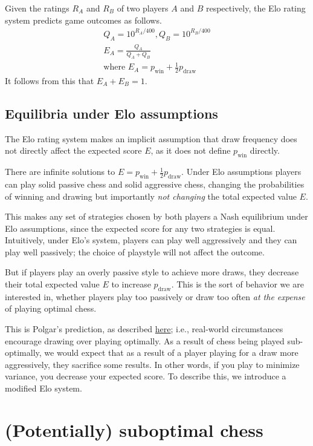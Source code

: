 \documentclass{article}
\begin{document}
Given the ratings $R_A$ and $R_B$ of two players $A$ and $B$ respectively, the Elo rating system predicts game outcomes as follows.
\begin{gather*}
    Q_A = 10^{R_A/400}, Q_B = 10^{R_B/400} \\
    E_A = \frac{Q_A}{Q_A+Q_B} \\
    \text{where } E_A = p_{\text{win}} + \frac{1}{2} p_{\text{draw}}
\end{gather*}
It follows from this that $E_A+E_B=1$.

\subsection{Equilibria under Elo assumptions}

The Elo rating system makes an implicit assumption that draw frequency does not directly affect
the expected score $E$, as it does not define $p_{\text{win}}$ directly.

There are infinite solutions to $E = p_{\text{win}} + \frac{1}{2} p_{\text{draw}}$.
Under Elo assumptions players can play solid passive chess and solid aggressive chess,
changing the probabilities of winning and drawing but importantly \textit{not changing}
the total expected value $E$.

This makes any set of strategies chosen by both players a Nash equilibrium under Elo assumptions, since the expected score for any two strategies is equal.
Intuitively, under Elo's system, players can play well
aggressively and they can play well passively; the choice of playstyle will not affect the outcome.

But if players play an overly passive style to achieve more draws,
they decrease their total expected value $E$ to increase $p_{\text{draw}}$.
This is the sort of behavior we are interested in, whether players play
too passively or draw too often \textit{at the expense} of playing optimal chess.

This is Polgar's prediction, as described \href{https://chessdailynews.com/the-700-lbs-gorilla-issue-to-draw-or-not-to-draw/}{here}; i.e., real-world circumstances encourage drawing over playing optimally.
As a result of chess being played sub-optimally, we would expect that as a result of a player playing for a draw more aggressively,
they sacrifice some results. In other words, if you play to minimize variance, you decrease your expected score.
To describe this, we introduce a modified Elo system.

\section{(Potentially) suboptimal chess}
\end{document}
